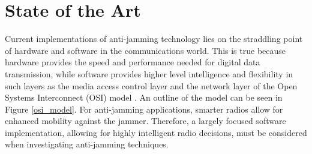\section{State of the Art}

Current implementations of anti-jamming technology lies on the straddling point of hardware and software in the communications world.  This is true because hardware provides the speed and performance needed for digital data transmission, while software provides higher level intelligence and flexibility in such layers as the media access control layer and the network layer of the Open Systems Interconnect (OSI) model \cite{Zimmermann}.  An outline of the model can be seen in Figure \ref{osi_model}. For anti-jamming applications, smarter radios allow for enhanced mobility against the jammer.  Therefore, a largely focused software implementation, allowing for highly intelligent radio decisions, must be considered when investigating anti-jamming techniques.\\

